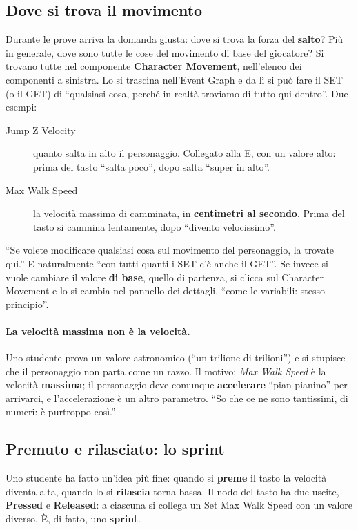 \subsection{Dove si trova il movimento}

Durante le prove arriva la domanda giusta: dove si trova la forza del
\textbf{salto}? Più in generale, dove sono tutte le cose del movimento di base
del giocatore? Si trovano tutte nel componente \textbf{Character Movement},
nell'elenco dei componenti a sinistra. Lo si trascina nell'Event Graph e da lì
si può fare il SET (o il GET) di ``qualsiasi cosa, perché in realtà troviamo
di tutto qui dentro''. Due esempi:
\begin{description}
  \item[Jump Z Velocity] quanto salta in alto il personaggio. Collegato alla
        E, con un valore alto: prima del tasto ``salta poco'', dopo salta
        ``super in alto''.
  \item[Max Walk Speed] la velocità massima di camminata, in
        \textbf{centimetri al secondo}. Prima del tasto si cammina lentamente,
        dopo ``divento velocissimo''.
\end{description}
``Se volete modificare qualsiasi cosa sul movimento del personaggio, la
trovate qui.'' E naturalmente ``con tutti quanti i SET c'è anche il GET''. Se
invece si vuole cambiare il valore \textbf{di base}, quello di partenza, si
clicca sul Character Movement e lo si cambia nel pannello dei dettagli,
``come le variabili: stesso principio''.

\paragraph{La velocità massima non è la velocità.} Uno studente prova un
valore astronomico (``un trilione di trilioni'') e si stupisce che il
personaggio non parta come un razzo. Il motivo: \emph{Max Walk Speed} è la
velocità \textbf{massima}; il personaggio deve comunque \textbf{accelerare}
``pian pianino'' per arrivarci, e l'accelerazione è un altro parametro. ``So
che ce ne sono tantissimi, di numeri: è purtroppo così.''

\subsection{Premuto e rilasciato: lo sprint}

Uno studente ha fatto un'idea più fine: quando si \textbf{preme} il tasto la
velocità diventa alta, quando lo si \textbf{rilascia} torna bassa. Il nodo del
tasto ha due uscite, \textbf{Pressed} e \textbf{Released}: a ciascuna si
collega un Set Max Walk Speed con un valore diverso. È, di fatto, uno
\textbf{sprint}.

